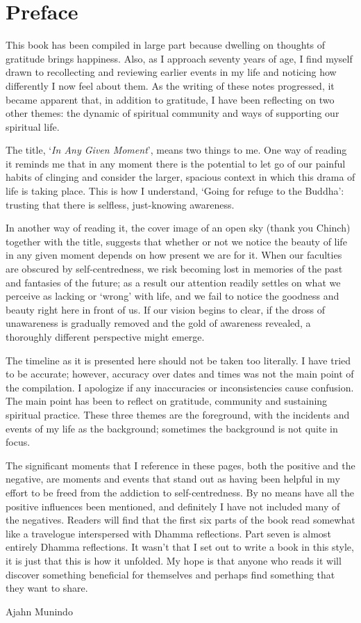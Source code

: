 \chapter{Preface}

This book has been compiled in large part because dwelling on thoughts
of gratitude brings happiness. Also, as I approach seventy years of age,
I find myself drawn to recollecting and reviewing earlier events in my
life and noticing how differently I now feel about them. As the writing
of these notes progressed, it became apparent that, in addition to
gratitude, I have been reflecting on two other themes: the dynamic of
spiritual community and ways of supporting our spiritual life.

The title, `\emph{In Any Given Moment}', means two things to me. One way
of reading it reminds me that in any moment there is the potential to
let go of our painful habits of clinging and consider the larger,
spacious context in which this drama of life is taking place. This is
how I understand, `Going for refuge to the Buddha': trusting that there
is selfless, just-knowing awareness.

In another way of reading it, the cover image of an open sky (thank you
Chinch) together with the title, suggests that whether or not we notice
the beauty of life in any given moment depends on how present we are for
it. When our faculties are obscured by self-centredness, we risk
becoming lost in memories of the past and fantasies of the future; as a
result our attention readily settles on what we perceive as lacking or
`wrong' with life, and we fail to notice the goodness and beauty right
here in front of us. If our vision begins to clear, if the dross of
unawareness is gradually removed and the gold of awareness revealed, a
thoroughly different perspective might emerge.

The timeline as it is presented here should not be taken too literally.
I have tried to be accurate; however, accuracy over dates and times was
not the main point of the compilation. I apologize if any inaccuracies
or inconsistencies cause confusion. The main point has been to reflect
on gratitude, community and sustaining spiritual practice. These three
themes are the foreground, with the incidents and events of my life as
the background; sometimes the background is not quite in focus.

The significant moments that I reference in these pages, both the
positive and the negative, are moments and events that stand out as
having been helpful in my effort to be freed from the addiction to
self-centredness. By no means have all the positive influences been
mentioned, and definitely I have not included many of the negatives.
Readers will find that the first six parts of the book read somewhat like a travelogue
interspersed with Dhamma reflections. Part seven is almost
entirely Dhamma reflections. It wasn't that I set out to write a book in
this style, it is just that this is how it unfolded. My hope is that
anyone who reads it will discover something beneficial for themselves
and perhaps find something that they want to share.

\bigskip

{\raggedleft
  Ajahn Munindo
\par}

